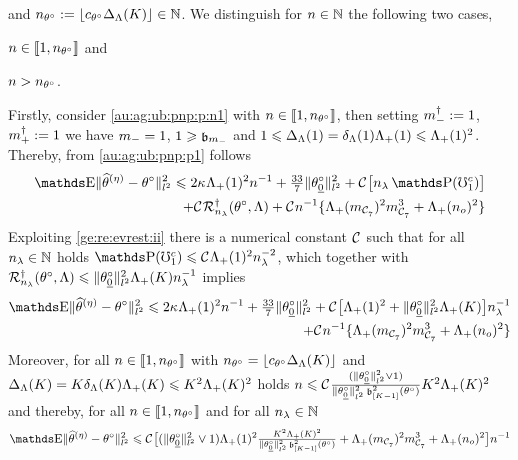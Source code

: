 \begin{pro}
and $\ssY_{\xdf}:=\floor{c_{\xdf}\DipenSv[K]}\in\Nz$. We distinguish for $n\in\Nz$ the following two
 cases, \begin{inparaenum}[i]\renewcommand{\theenumi}{\dgrau\rm(\alph{enumi})}\item\label{au:ag:ub:pnp:p:n1}
$\ssY\in\nset{1,\ssY_{\xdf}}$ and \item\label{au:ag:ub:pnp:p:n2}
$\ssY> \ssY_{\xdf}$. \end{inparaenum} Firstly, consider
\ref{au:ag:ub:pnp:p:n1} with $\ssY\in\nset{1,\ssY_{\xdf}}$, then setting $\mdDi:=1$, $\pdDi:=1$ we have
$\mDi=1$, $1\geq\bias[\mDi]$ and  $1\leq\DipenSv[1]=\cmSv[1]
\miSv[1]\leq\miSv[1]^2$. Thereby,  from \eqref{au:ag:ub:pnp:p1} 
follows
 \begin{multline*}
    \E\Vnormlp{\widehat{\theta}^{(\eta)}-\xdf}^2\leq
  2\cpen\miSv[1]^2\ssY^{-1} +\tfrac{33}{7}\Vnormlp{\xdf_{\underline{0}}}^2 + \cst{}\big[\ssE\P(\aixEv[1]^c) \big]
    \\\hfill
    +\cst{}\mRa{\xdf,\Lambda}
    +\cst{}\ssY^{-1}\{\miSv[\Di_{\cst{7}}]^2\Di_{\cst{7}}^3+\miSv[\ssY_{o}]^2\}
  \end{multline*}
  Exploiting  \ref{ge:re:evrest:ii} there is a
numerical constant $\cst{}$ such that for all  $\ssE\in\Nz$ holds
$\P(\aixEv[1]^c)\leq\cst{}\miSv[1]^2\ssE^{-2}$, which
together with
$\mRa{\xdf,\Lambda}\leq
\Vnormlp{\xdf_{\underline{0}}}^2\miSv[K]\ssE^{-1}$ implies
 \begin{multline*}
    \E\Vnormlp{\widehat{\theta}^{(\eta)}-\xdf}^2\leq
  2\cpen\miSv[1]^2\ssY^{-1} +\tfrac{33}{7}\Vnormlp{\xdf_{\underline{0}}}^2 +
  \cst{}\big[\miSv[1]^2 +\Vnormlp{\xdf_{\underline{0}}}^2\miSv[K] \big]\ssE^{-1}
    \\\hfill
    +\cst{}\ssY^{-1}\{\miSv[\Di_{\cst{7}}]^2\Di_{\cst{7}}^3+\miSv[\ssY_{o}]^2\}
  \end{multline*}
Moreover, for all $\ssY\in\nset{1,\ssY_{\xdf}}$ with
$\ssY_{\xdf}=\floor{c_{\xdf}\DipenSv[K]}$ and
$\DipenSv[K]=K\cmSv[K] \miSv[K]\leq K^2\miSv[K]^2$ holds
$\ssY\leq\cst{}\tfrac{(\Vnormlp{\xdf_{\underline{0}}}^2\vee1)}{\Vnormlp{\xdf_{\underline{0}}}^2\bias[{[K-1]}]^2(\xdf)}
K^2\miSv[K]^2$ and thereby, for all $\ssY\in\nset{1,\ssY_{\xdf}}$ and
for all $\ssE\in\Nz$
\begin{multline}\label{au:ag:ub:pnp:p4}
  \E\Vnormlp{\widehat{\theta}^{(\eta)}-\xdf}^2\leq
  \cst{}\big[(\Vnormlp{\xdf_{\underline{0}}}^2\vee1)\miSv[1]^2\tfrac{K^2\miSv[K]^2}{\Vnormlp{\xdf_{\underline{0}}}^2\bias[{[K-1]}]^2(\xdf)}+\miSv[\Di_{\cst{7}}]^2\Di_{\cst{7}}^3+\miSv[\ssY_{o}]^2\big]\ssY^{-1}\\

\end{multline}
\end{pro}
